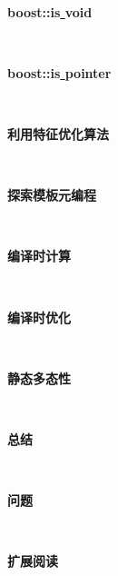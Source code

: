 \noindent\textbf{}\ \par
\textbf{boost::is\underline{ }void} \ \par

\noindent\textbf{}\ \par
\textbf{boost::is\underline{ }pointer} \ \par

\noindent\textbf{}\ \par
\textbf{利用特征优化算法} \ \par

\noindent\textbf{}\ \par
\textbf{探索模板元编程} \ \par

\noindent\textbf{}\ \par
\textbf{编译时计算} \ \par

\noindent\textbf{}\ \par
\textbf{编译时优化} \ \par

\noindent\textbf{}\ \par
\textbf{静态多态性} \ \par

\noindent\textbf{}\ \par
\textbf{总结} \ \par

\noindent\textbf{}\ \par
\textbf{问题} \ \par

\noindent\textbf{}\ \par
\textbf{扩展阅读} \ \par

\newpage